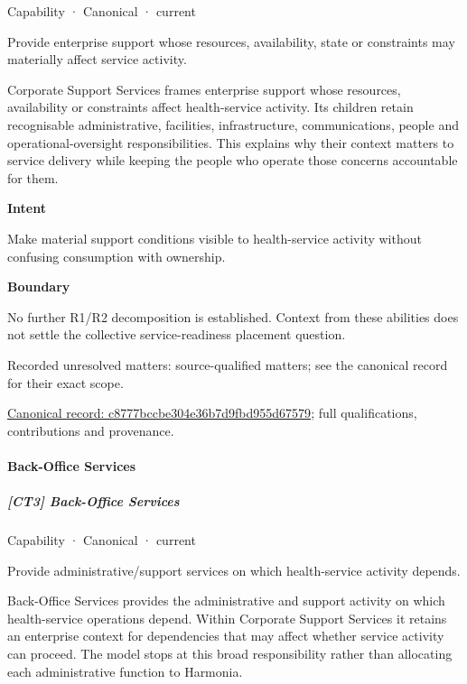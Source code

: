 \label{element:c8777bccbe304e36b7d9fbd955d67579}
{\small Capability · Canonical · current}\par

Provide enterprise support whose resources, availability, state or constraints may materially affect service activity.



Corporate Support Services frames enterprise support whose resources, availability or constraints affect health-service activity. Its children retain recognisable administrative, facilities, infrastructure, communications, people and operational-oversight responsibilities. This explains why their context matters to service delivery while keeping the people who operate those concerns accountable for them.



\textbf{Intent}



Make material support conditions visible to health-service activity without confusing consumption with ownership.



\textbf{Boundary}



No further R1/R2 decomposition is established. Context from these abilities does not settle the collective service-readiness placement question.


{\small Recorded unresolved matters: source-qualified matters; see the canonical record for their exact scope.}\par
{\footnotesize \href{../../../../continuum/strategy/capability/c8777bccbe304e36b7d9fbd955d67579.md}{Canonical record: c8777bccbe304e36b7d9fbd955d67579}; full qualifications, contributions and provenance.}\par
\paragraph{Back-Office Services}

\subparagraph{[CT3] Back-Office Services}

\label{element:9f4d3705403647f4a1e25bc3dece035f}
{\small Capability · Canonical · current}\par

Provide administrative/support services on which health-service activity depends.



Back-Office Services provides the administrative and support activity on which health-service operations depend. Within Corporate Support Services it retains an enterprise context for dependencies that may affect whether service activity can proceed. The model stops at this broad responsibility rather than allocating each administrative function to Harmonia.



